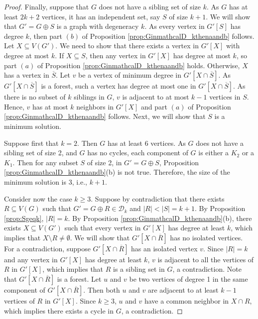 \documentclass[11pt]{article}
\theoremstyle{definition}
\begin{document}
\begin{proof}
Finally, suppose that $G$ does not have a sibling set of size $k$. As $G$ has at least $2k+2$ vertices, it has an independent set, say $S$ of size $k+1$.
We will show that $G'=G \oplus S$ is a graph with degeneracy $k$. As every vertex in $G'[S]$ has degree $k$, then part $(b)$ of Proposition \ref{prop:GinmathcalD_kthenaandb} follows.
Let $X \subseteq V(G')$. We need to show that there exists a vertex in $G'[X]$ with degree at most $k$.
If $X \subseteq S$, then any vertex in $G'[X]$ has degree at most $k$, so part $(a)$ of Proposition \ref{prop:GinmathcalD_kthenaandb} holds.
Otherwise, $X$ has a vertex in $\overline{S}$.
Let $v$ be a vertex of minimum degree in $G'[X \cap \overline{S}]$. As $G'[X \cap \overline{S}]$ is a forest, such a vertex has degree at most one in
$G'[X \cap \overline{S}]$.
As there is no subset of $k$ siblings in $G$,
$v$ is adjacent to at most $k-1$ vertices in $S$.
Hence, $v$ has at most $k$ neighbors in $G'[X]$ and part $(a)$ of Proposition \ref{prop:GinmathcalD_kthenaandb} follows.
Next, we will show that $S$ is a minimum solution.

Suppose first that $k=2$. Then $G$ has at least 6 vertices.
 As $G$ does not have a sibling set of size 2, and $G$ has no cycles, 
each component of $G$ is either a $K_2$ or a $K_1$.
Then for any subset $S$ of size 2, in $G'=G\oplus S$,
Proposition \ref{prop:GinmathcalD_kthenaandb}(b) is not true.
Therefore, the size of the minimum solution is 3, i.e., $k+1$.


Consider now the case $k\geq 3$.
Suppose by contradiction that there exists $R \subseteq V(G)$ such that $G'=G \oplus R \in \mathcal{D}_k$ and $|R| < |S| = k+1$.
By Proposition \ref{prop:Sgeqk}, $|R|=k$.
By Proposition \ref{prop:GinmathcalD_kthenaandb}(b), there exists
    $X \subseteq V(G')$  such that every vertex in $G'[X]$ has degree at least $k$, which implies 
    that $X \setminus R \neq \emptyset$.
    We will show that $G' [X \cap \overline{R}]$ has no isolated vertices.
For a contradiction, suppose $G' [X \cap \overline{R}]$ has an isolated vertex $v$.
Since $|R|=k$ and any vertex in $G'[X]$ has degree at least $k$, $v$ is 
adjacent to all the vertices of $R$ in $G'[X]$, which implies that $R$ is a sibling set in $G$, a contradiction.
Note that 
$G' [X \cap \overline{R}]$ is a forest.
Let $u$ and $v$ be two vertices of degree 1 in the same component of $G' [X \cap \overline{R}]$.
Then both $u$ and $v$ are adjacent to at least $k-1$ vertices of
$R$ in $G'[X]$. Since $k\geq 3$, $u$ and $v$ have a common neighbor in $X\cap R$, 
which implies there exists a cycle in $G$, a contradiction.
\end{proof}
\end{document}
